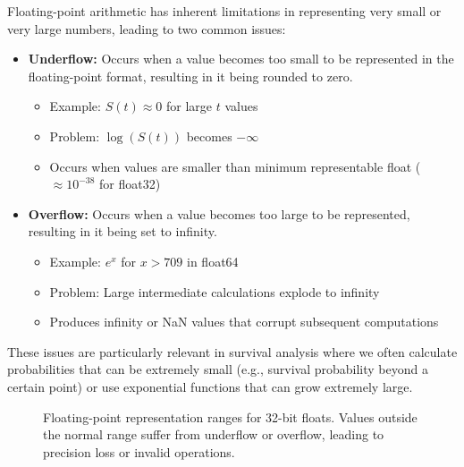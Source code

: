 Floating-point arithmetic has inherent limitations in representing very small or very large numbers, leading to two common issues:

\begin{definitionbox}[title=Underflow and Overflow]
\begin{itemize}
    \item \textbf{Underflow:} Occurs when a value becomes too small to be represented in the floating-point format, resulting in it being rounded to zero.
    \begin{itemize}
        \item Example: $S(t) \approx 0$ for large $t$ values
        \item Problem: $\log(S(t))$ becomes $-\infty$
        \item Occurs when values are smaller than minimum representable float ($\approx 10^{-38}$ for float32)
    \end{itemize}
    
    \item \textbf{Overflow:} Occurs when a value becomes too large to be represented, resulting in it being set to infinity.
    \begin{itemize}
        \item Example: $e^x$ for $x > 709$ in float64
        \item Problem: Large intermediate calculations explode to infinity
        \item Produces infinity or NaN values that corrupt subsequent computations
    \end{itemize}
\end{itemize}
\end{definitionbox}

These issues are particularly relevant in survival analysis where we often calculate probabilities that can be extremely small (e.g., survival probability beyond a certain point) or use exponential functions that can grow extremely large.

\begin{figure}[htbp]
    \centering
    \caption{Floating-point representation ranges for 32-bit floats. Values outside the normal range suffer from underflow or overflow, leading to precision loss or invalid operations.}
    \label{fig:float-ranges}
\end{figure}


